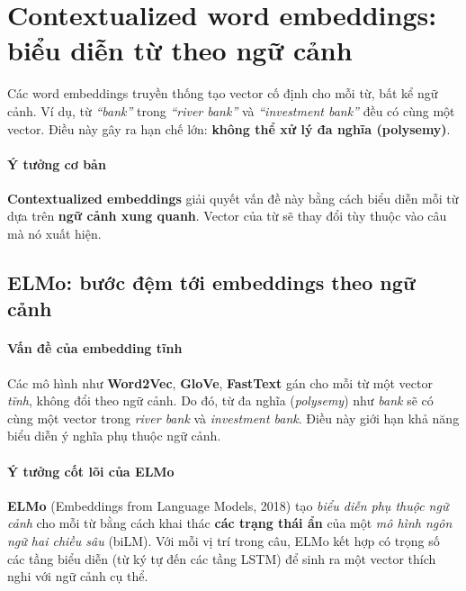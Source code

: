 
\section{Contextualized word embeddings: biểu diễn từ theo ngữ cảnh}
\label{sec:contextualized_embeddings}

Các word embeddings truyền thống tạo vector cố định cho mỗi từ, bất kể ngữ cảnh. Ví dụ, từ \textit{“bank”} trong \textit{“river bank”} và \textit{“investment bank”} đều có cùng một vector. Điều này gây ra hạn chế lớn: \textbf{không thể xử lý đa nghĩa (polysemy)}.

\paragraph{Ý tưởng cơ bản}\leavevmode

\textbf{Contextualized embeddings} giải quyết vấn đề này bằng cách biểu diễn mỗi từ dựa trên \textbf{ngữ cảnh xung quanh}. Vector của từ sẽ thay đổi tùy thuộc vào câu mà nó xuất hiện.

\subsection{ELMo: bước đệm tới embeddings theo ngữ cảnh}
\label{ssec:elmo}

\paragraph{Vấn đề của embedding tĩnh}
Các mô hình như \textbf{Word2Vec}, \textbf{GloVe}, \textbf{FastText} gán cho mỗi từ một vector \emph{tĩnh}, không đổi theo ngữ cảnh. Do đó, từ đa nghĩa (\emph{polysemy}) như \textit{bank} sẽ có cùng một vector trong \emph{river bank} và \emph{investment bank}. Điều này giới hạn khả năng biểu diễn ý nghĩa phụ thuộc ngữ cảnh.

\paragraph{Ý tưởng cốt lõi của ELMo}
\textbf{ELMo} (Embeddings from Language Models, 2018) \cite{peters2018deep} tạo \emph{biểu diễn phụ thuộc ngữ cảnh} cho mỗi từ bằng cách khai thác \textbf{các trạng thái ẩn} của một \emph{mô hình ngôn ngữ hai chiều sâu} (biLM). Với mỗi vị trí trong câu, ELMo kết hợp có trọng số các tầng biểu diễn (từ ký tự đến các tầng LSTM) để sinh ra một vector thích nghi với ngữ cảnh cụ thể.

